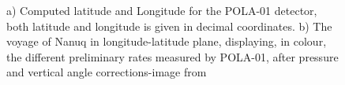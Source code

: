 \documentclass[prX, twocolumn, a4paper]{revtex4}
\begin{document}
\begin{figure}
    \centering
    \caption{a) Computed latitude and Longitude for the POLA-01 detector, both latitude and longitude is given in decimal coordinates. b) The voyage of Nanuq in longitude-latitude plane, displaying, in colour, the different preliminary rates measured by POLA-01, after pressure and vertical angle corrections-image from \cite{EEEcosmicrays}}
    \label{fig:coordinates_POLA01_ab}
\end{figure}
\end{document}
